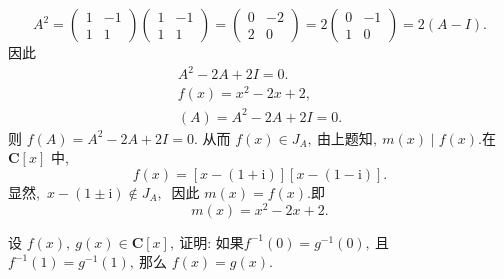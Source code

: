 \begin{solution}
	$$A^{2}=\left(\begin{array}{cc}1 & -1 \\ 1 & 1\end{array}\right)\left(\begin{array}{cc}1 & -1 \\ 1 & 1\end{array}\right)=\left(\begin{array}{cc}0 & -2 \\ 2 & 0\end{array}\right) 
	=2\left(\begin{array}{cc}
		0 & -1 \\
		1 & 0
	\end{array}\right)=2(A-I) .$$
	因此
	$$\begin{array}{c}
		A^{2}-2 A+2 I=0 . \\
		f(x)=x^{2}-2 x+2,\  \\
		(A)=A^{2}-2 A+2 I=0 .
	\end{array}$$
	则  $f(A)=A^{2}-2 A+2 I=0 .$
	从而  $f(x) \in J_{A}  ,\ $由上题知$,\  m(x) \mid f(x)  .$在 $ \mathbf{C}[x]$  中,\ 
	$$f(x)=[x-(1+\mathrm{i})][x-(1-\mathrm{i})].$$
	显然,\  $ x-(1 \pm \mathrm{i}) \notin J_{A} ,\ $ 因此  $m(x)=f(x)  .$即
	$$m(x)=x^{2}-2 x+2 .$$
\end{solution}
\newpage
\begin{problem}
	设 $ f(x),\  g(x) \in \mathbf{C}[x] ,\  $证明: 如果$  f^{-1}(0)=g^{-1}(0) ,\  $且 $ f^{-1}(1)=g^{-1}(1) ,\  $那么 $ f(x)=g(x)  .$
\end{problem}
